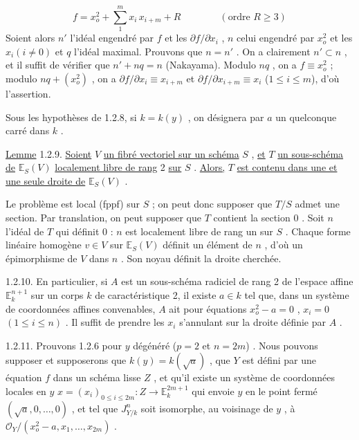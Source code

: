 \begin{equation*}
f = x_o^2 + \sum_1^m x_i\, x_{i+m} + R \qquad\qquad (\text{ordre } R \geq 3)
\end{equation*}
Soient alors $n'$ l'idéal engendré par $f$ et les $\partial f/\partial x_i$ , $n$ celui engendré par $x_o^2$ et les $x_i(i \neq 0)$ et $q$ l'idéal maximal. Prouvons que $n = n'$ . On a clairement $n' \subset n$ , et il suffit de vérifier que $n' + nq = n$ (Nakayama). Modulo $nq$ , on a $f \equiv x_o^2$ ; modulo $nq + (x_o^2)$ , on a $\partial f/\partial x_i \equiv x_{i+m}$ et $\partial f/\partial x_{i+m} \equiv x_i$ ($1 \leq i \leq m$), d'où l'assertion.

Sous les hypothèses de 1.2.8, si $k = k(y)$ , on désignera par $a$ un quelconque carré dans $k$ .



\underline{Lemme} 1.2.9. \underline{Soient} $V$ \underline{un fibré vectoriel sur un schéma} $S$ , \underline{et} $T$ \underline{un sous-schéma de} $\mathbb{E}_S(V)$ \underline{localement libre de rang} 2 \underline{sur} $S$ . \underline{Alors,} $T$ \underline{est contenu dans une et une seule droite de} $\mathbb{E}_S(V)$ .

Le problème est local (fppf) sur $S$ ; on peut donc supposer que $T/S$ admet une section. Par translation, on peut supposer que $T$ contient la section $0$ . Soit $n$ l'idéal de $T$ qui définit $0$ : $n$ est localement libre de rang un sur $S$ . Chaque forme linéaire homogène $v \in V$ sur $\mathbb{E}_S(V)$ définit un élément de $n$ , d'où un épimorphisme de $V$ dans $n$ . Son noyau définit la droite cherchée.

1.2.10. En particulier, si $A$ est un sous-schéma radiciel de rang 2 de l'espace affine $\mathbb{E}_k^{n+1}$ sur un corps $k$ de caractéristique 2, il existe $a \in k$ tel que, dans un système de coordonnées affines convenables, $A$ ait pour équations $x_o^2 - a = 0$ , $x_i = 0$ $(1 \leq i \leq n)$ . Il suffit de prendre les $x_i$ s'annulant sur la droite définie par $A$ .

1.2.11. Prouvons 1.2.6 pour $y$ dégénéré ($p = 2$ et $n = 2m$) . Nous pouvons supposer et supposerons que $k(y) = k(\sqrt{a})$ , que $Y$ est défini par une équation $f$ dans un schéma lisse $Z$ , et qu'il existe un système de coordonnées locales en $y$ $x = (x_i)_{0 \leq i \leq 2m} : Z \longrightarrow \mathbb{E}_k^{2m+1}$ qui envoie $y$ en le point fermé $(\sqrt{a},0,\ldots,0)$ , et tel que $J^n_{Y/k}$ soit isomorphe, au voisinage de $y$ , à $\mathcal{O}_Y /(x_o^2 - a , x_1,\ldots,x_{2m})$ .

